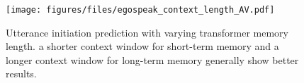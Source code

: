 \begin{figure}[t]
\centering
\texttt{[image: figures/files/egospeak\_context\_length\_AV.pdf]}
\caption{Utterance initiation prediction with varying transformer memory length. a shorter context window for short-term memory and a longer context window for long-term memory generally show better results.}
\label{fig:context_length}
\end{figure}
